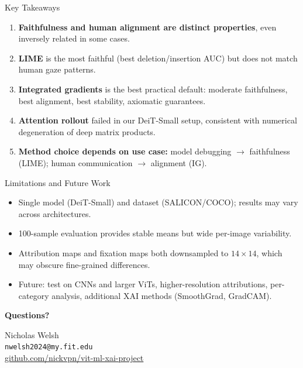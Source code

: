 \documentclass{beamer}
\begin{document}
\begin{frame}{Key Takeaways}
\begin{enumerate}
  \item \textbf{Faithfulness and human alignment are distinct properties}, even inversely related in some cases.
  \item \textbf{LIME} is the most faithful (best deletion/insertion AUC) but does not match human gaze patterns.
  \item \textbf{Integrated gradients} is the best practical default: moderate faithfulness, best alignment, best stability, axiomatic guarantees.
  \item \textbf{Attention rollout} failed in our DeiT-Small setup, consistent with numerical degeneration of deep matrix products.
  \item \textbf{Method choice depends on use case:} model debugging $\rightarrow$ faithfulness (LIME); human communication $\rightarrow$ alignment (IG).
\end{enumerate}
\end{frame}

\begin{frame}{Limitations and Future Work}
\begin{itemize}
  \item Single model (DeiT-Small) and dataset (SALICON/COCO); results may vary across architectures.
  \item 100-sample evaluation provides stable means but wide per-image variability.
  \item Attribution maps and fixation maps both downsampled to $14\!\times\!14$, which may obscure fine-grained differences.
  \item Future: test on CNNs and larger ViTs, higher-resolution attributions, per-category analysis, additional XAI methods (SmoothGrad, GradCAM).
\end{itemize}
\end{frame}

\begin{frame}
\begin{center}
\Large\textbf{Questions?}

\vfill
\normalsize
Nicholas Welsh \\
\texttt{nwelsh2024@my.fit.edu} \\
\vspace{0.5cm}
\href{https://github.com/nickvpn/vit-ml-xai-project}{github.com/nickvpn/vit-ml-xai-project}
\end{center}
\end{frame}
\end{document}
